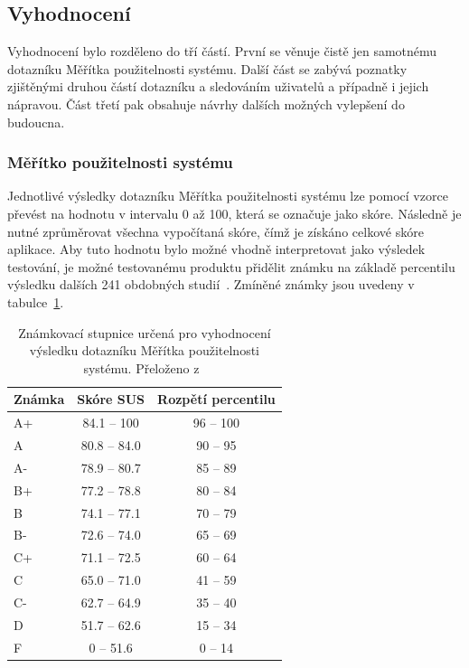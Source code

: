 \subsection{Vyhodnocení}
Vyhodnocení bylo rozděleno do tří částí. První se věnuje čistě jen samotnému dotazníku Měřítka použitelnosti systému. Další část se zabývá poznatky zjištěnými druhou částí dotazníku a sledováním uživatelů a případně i jejich nápravou. Část třetí pak obsahuje návrhy dalších možných vylepšení do budoucna. 


\subsubsection{Měřítko použitelnosti systému}
Jednotlivé výsledky dotazníku Měřítka použitelnosti systému lze pomocí vzorce převést na hodnotu v intervalu 0 až 100, která se označuje jako skóre. Následně je nutné zprůměrovat všechna vypočítaná skóre, čímž je získáno celkové skóre aplikace. Aby tuto hodnotu bylo možné vhodně interpretovat jako výsledek testování, je možné testovanému produktu přidělit známku na základě percentilu výsledku dalších 241 obdobných studií~\cite{bib:sus-statistics}. Zmíněné známky jsou uvedeny v tabulce~\ref{tab:sus}.

\begin{table}[H]
\centering
\label{tab:sus}
\caption{Známkovací stupnice určená pro vyhodnocení výsledku dotazníku Měřítka použitelnosti systému. Přeloženo z~\cite{bib:sus-statistics}}
\begin{tabular}{|l|c|c|}
\hline
Známka & Skóre SUS  & Rozpětí percentilu  \\
\hline
A+    & 84.1 – 100  & 96 – 100          \\
A     & 80.8 – 84.0 & 90 – 95           \\
A-    & 78.9 – 80.7 & 85 – 89           \\
B+    & 77.2 – 78.8 & 80 – 84           \\
B     & 74.1 – 77.1 & 70 – 79           \\
B-    & 72.6 – 74.0 & 65 – 69           \\
C+    & 71.1 – 72.5 & 60 – 64           \\
C     & 65.0 – 71.0 & 41 – 59           \\
C-    & 62.7 – 64.9 & 35 – 40           \\
D     & 51.7 – 62.6 & 15 – 34           \\
F     & 0 – 51.6    & 0 – 14            \\
\hline
\end{tabular}
\end{table}

